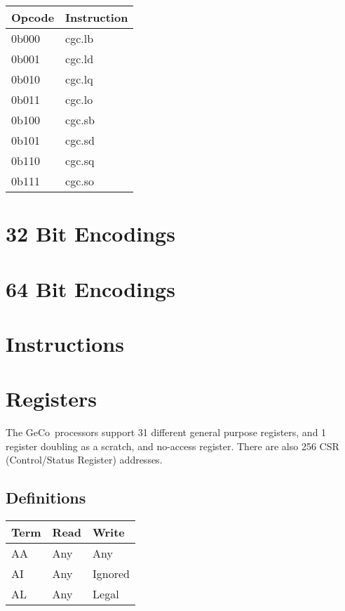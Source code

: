 \documentclass[6pt]{article}
\def\sname{GeCo}
\begin{document}
\begin{center}
\begin{tabularx}{\textwidth}{ |>{\raggedright\arraybackslash}X|>{\raggedright\arraybackslash}X| }
    \hline
    Opcode & Instruction \\
    \hline
    0b000 & cgc.lb \\
    \hline
    0b001 & cgc.ld \\
    \hline
    0b010 & cgc.lq \\
    \hline
    0b011 & cgc.lo \\
    \hline
    0b100 & cgc.sb \\
    \hline
    0b101 & cgc.sd \\
    \hline
    0b110 & cgc.sq \\
    \hline
    0b111 & cgc.so \\
    \hline
\end{tabularx}
\end{center}

\section{32 Bit Encodings}

\section{64 Bit Encodings}

\section{Instructions}

\section{Registers}
The \sname\ processors support 31 different general purpose registers, and 1 register doubling as a scratch, and no-access register. There are also 256 CSR (Control/Status Register) addresses.

\subsection{Definitions}
\begin{center}
\begin{tabularx}{\textwidth}{ |>{\raggedright\arraybackslash}X|>{\raggedright\arraybackslash}X|>{\raggedright\arraybackslash}X| }
    \hline
    Term & Read & Write \\
    \hline
    AA & Any & Any \\
    \hline
    AI & Any & Ignored \\
    \hline
    AL & Any & Legal \\
    \hline
\end{tabularx}
\end{center}
\end{document}
